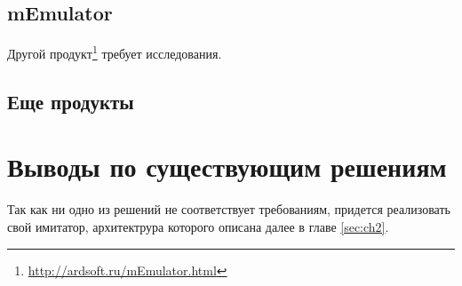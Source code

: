 \subsection{mEmulator}
Другой продукт\footnote{\url{http://ardsoft.ru/mEmulator.html}} требует исследования.


\subsection{Еще продукты}


\section{Выводы по существующим решениям}

Так как ни одно из решений не соответствует требованиям, придется реализовать свой
имитатор, архитектрура которого описана далее в главе \ref{sec:ch2}.